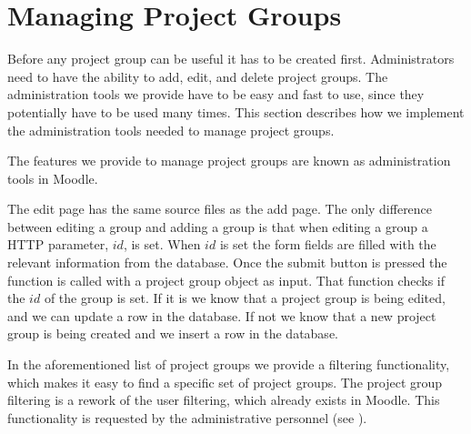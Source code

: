 \section{Managing Project Groups} %
\label{sec:manProjGrpImpl}
Before any project group can be useful it has to be created first.
Administrators need to have the ability to add, edit, and delete project groups.
The administration tools we provide have to be easy and fast to use, since they potentially have to be used many times.
This section describes how we implement the administration tools needed to manage project groups.

The features we provide to manage project groups are known as administration tools in Moodle.

The edit page has the same source files as the add page.
The only difference between editing a group and adding a group is that when editing a group a HTTP parameter, $id$, is set.
When $id$ is set the form fields are filled with the relevant information from the database.
Once the submit button is pressed the function  is called with a project group object as input.
That function checks if the $id$ of the group is set. 
If it is we know that a project group is being edited, and we can update a row in the database.
If not we know that a new project group is being created and we insert a row in the database.

In the aforementioned list of project groups we provide a filtering functionality, which makes it easy to find a specific set of project groups.
The project group filtering is a rework of the user filtering, which already exists in Moodle.
This functionality is requested by the administrative personnel (see ).
